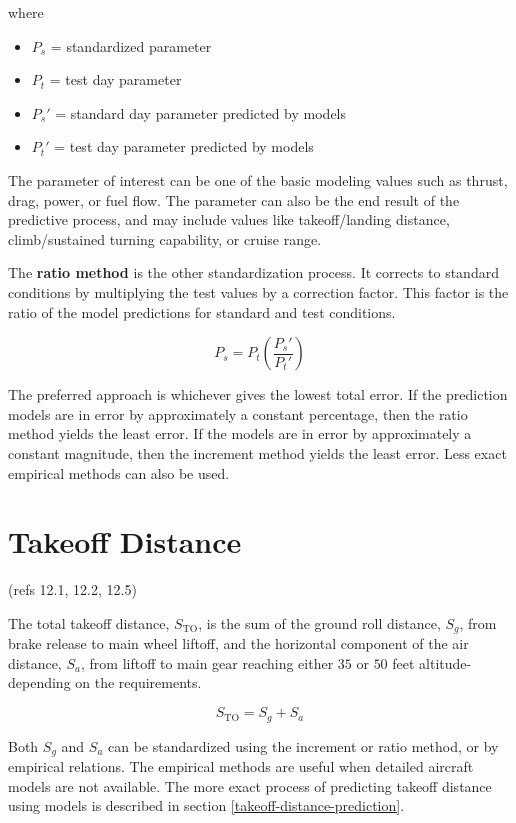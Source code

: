 \documentclass[
]{book}
\providecommand{\tightlist}{%
  \setlength{\itemsep}{0pt}\setlength{\parskip}{0pt}}
\begin{document}
where

\begin{itemize}
\tightlist
\item
  \(P_s\) = standardized parameter
\item
  \(P_t\) = test day parameter
\item
  \(P_s'\) = standard day parameter predicted by models
\item
  \(P_t'\) = test day parameter predicted by models
\end{itemize}

The parameter of interest can be one of the basic modeling values such as thrust, drag, power, or fuel flow.
The parameter can also be the end result of the predictive process, and may include values like takeoff/landing distance, climb/sustained turning capability, or cruise range.

The \textbf{ratio method} is the other standardization process. It corrects to standard conditions by multiplying the test values by a correction factor.
This factor is the ratio of the model predictions for standard and test conditions.

\[
P_s = P_t  \left( \frac{P_s'}{P_t'} \right)
\label{eq:ratio}
\]

The preferred approach is whichever gives the lowest total error.
If the prediction models are in error by approximately a constant percentage, then the ratio method yields the least error.
If the models are in error by approximately a constant magnitude, then the increment method yields the least error.
Less exact empirical methods can also be used.

\hypertarget{takeoff-distance}{%
\section{Takeoff Distance}\label{takeoff-distance}}

(refs 12.1, 12.2, 12.5)

The total takeoff distance, \(S_{\mathrm{TO}}\), is the sum of the ground roll distance, \(S_g\), from brake release to main wheel liftoff, and the horizontal component of the air distance, \(S_a\), from liftoff to main gear reaching either \(35\) or \(50\) feet altitude-depending on the requirements.

\[
S_{\mathrm{TO}} = S_g + S_a
\label{eq:tot-takeoff}
\]

Both \(S_g\) and \(S_a\) can be standardized using the increment or ratio method, or by empirical relations.
The empirical methods are useful when detailed aircraft models are not available.
The more exact process of predicting takeoff distance using models is described in section \ref{takeoff-distance-prediction}.
\end{document}
